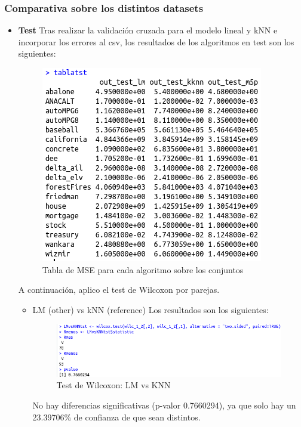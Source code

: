 \subsubsection{Comparativa sobre los distintos datasets}

\begin{itemize}
	\item \textbf{Test}
		Tras realizar la validación cruzada para el modelo lineal y kNN e incorporar los errores al csv, los resultados de los algoritmos en test son los siguientes:
		\begin{figure}[H] %
			\centering
			\includegraphics[scale=0.6]{tablatst-R4.png}  %
			\caption{Tabla de MSE para cada algoritmo sobre los conjuntos} 
			\label{fig:tablatst-R4}
		\end{figure}
	
		A continuación, aplico el test de Wilcoxon por parejas.
		\begin{itemize}
			\item LM (other) vs kNN (reference)
			Los resultados son los siguientes:
			
			\begin{figure}[H] %
				\centering
				\includegraphics[scale=0.6]{lmknn1.png}  %
				\caption{Test de Wilcoxon: LM vs KNN} 
				\label{fig:lmknn1}
			\end{figure}
			No hay diferencias significativas (p-valor 0.7660294), ya que solo hay un 23.39706\% de confianza de que sean distintos.
		

\end{itemize}
\end{itemize}
